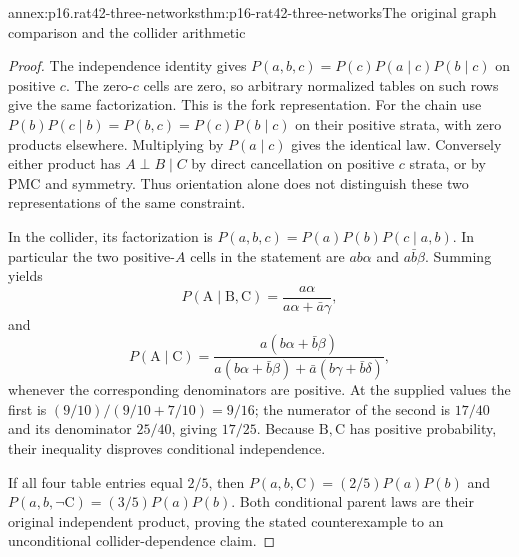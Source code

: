 \begin{annexitem}{annex:p16.rat42-three-networks}{thm:p16-rat42-three-networks}{The original graph comparison and the collider arithmetic}
\begin{proof}
The independence identity gives
\(P(a,b,c)=P(c)P(a\mid c)P(b\mid c)\) on positive \(c\).
The zero-\(c\) cells are zero, so arbitrary normalized tables on
such rows give the same factorization. This is the fork representation.
For the chain use
\(P(b)P(c\mid b)=P(b,c)=P(c)P(b\mid c)\) on their positive
strata, with zero products elsewhere. Multiplying by
\(P(a\mid c)\) gives the identical law. Conversely either product
has \(A\perp B\mid C\) by direct cancellation on positive
\(c\) strata, or by PMC and symmetry. Thus orientation alone does
not distinguish these two representations of the same constraint.

In the collider, its factorization is
\(P(a,b,c)=P(a)P(b)P(c\mid a,b)\). In particular the two
positive-\(A\) cells in the statement are \(ab\alpha\) and
\(a\bar b\beta\). Summing yields
\[
 P(\mathrm A\mid\mathrm B,\mathrm C)
 =\frac{a\alpha}{a\alpha+\bar a\gamma},
\]
and
\[
 P(\mathrm A\mid\mathrm C)
 =\frac{a(b\alpha+\bar b\beta)}
 {a(b\alpha+\bar b\beta)+\bar a(b\gamma+\bar b\delta)},
\]
whenever the corresponding denominators are positive. At the supplied
values the first is \((9/10)/(9/10+7/10)=9/16\); the numerator
of the second is \(17/40\) and its denominator \(25/40\),
giving \(17/25\). Because \(\mathrm B,\mathrm C\) has positive
probability, their inequality disproves conditional independence.

If all four table entries equal \(2/5\), then
\(P(a,b,\mathrm C)=(2/5)P(a)P(b)\) and
\(P(a,b,\neg\mathrm C)=(3/5)P(a)P(b)\). Both conditional
parent laws are their original independent product, proving
the stated counterexample to an unconditional collider-dependence claim.
\end{proof}
\end{annexitem}


